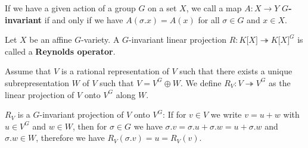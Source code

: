 
\begin{definition}
  If we have a given action of a group $G$ on a set $X$, we call a map $A \colon X \rightarrow Y$ \textbf{$G$-invariant} if and only if we have $A(\sigma.x) = A(x)$ for all $\sigma \in G$ and $x \in X$.
\end{definition}

\begin{definition}
  Let $ X $ be an affine $G$-variety.
  A $ G $-invariant linear projection $R \colon K\lbrack X \rbrack \twoheadrightarrow K\lbrack X \rbrack^G $ is called a \textbf{Reynolds operator}. 
\end{definition}

\begin{definition}
  Assume that $V$ is a rational representation of $V$ such that there exists a unique subrepresentation $W$ of $V$ such that $V = V^G \oplus W$.
 We define $R_V \colon V \twoheadrightarrow V^G$ as the linear projection of $V$ onto $V^G$ along $W$.
\end{definition}

\begin{remark}
  $R_V$ is a $G$-invariant projection of $V$ onto $V^G$:
  If for $v \in V$ we write $v = u + w$ with $u \in V^G$ and $w \in W$, then for $\sigma \in G$ we have $\sigma.v = \sigma.u + \sigma.w = u + \sigma.w$ and $\sigma.w \in W$, therefore we have $R_V(\sigma.v) = u = R_V(v)$.
\end{remark}

